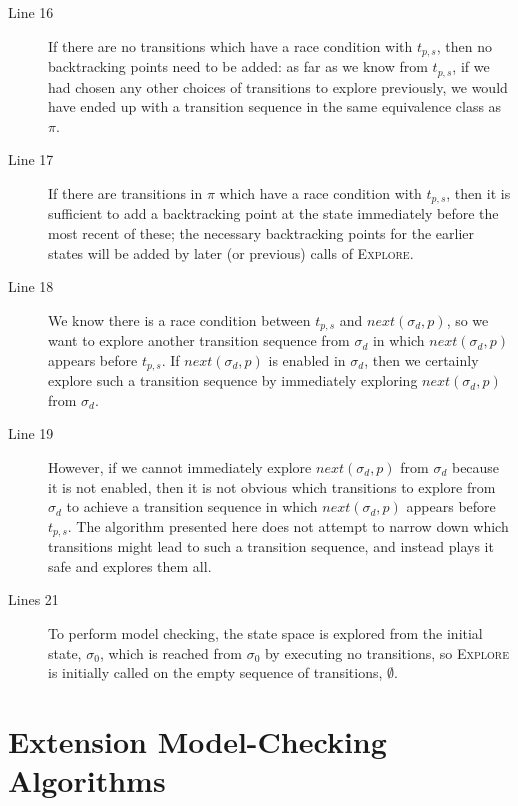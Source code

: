 \documentclass[12pt,a4paper,twoside,openright]{report}
\begin{document}
\begin{description}
	\item[Line 16] If there are no transitions which have
	a race condition with $t_{p,s}$, then no backtracking
	points need to be added: as far as we know from $t_{p,s}$,
	if we had chosen any other
	choices of transitions to explore previously, we would
	have ended up with a transition sequence in the same
	equivalence class as $\pi$.

	\item[Line 17] If there are transitions in $\pi$
	which have a race condition with $t_{p,s}$, then
	it is sufficient to add a backtracking point at
	the state immediately before
	the most recent of these;
	the necessary backtracking
	points for the earlier states will be added
	by later (or previous) calls of \textsc{Explore}.

	\item[Line 18] We know there is a race condition
	between $t_{p,s}$ and $\textit{next}(\sigma_d,p)$, so
	we want to explore another transition sequence from
	$\sigma_d$ in which $\textit{next}(\sigma_d,p)$
	appears before $t_{p,s}$. If $\textit{next}(\sigma_d,p)$
	is enabled in $\sigma_d$, then we certainly explore such
	a transition sequence by immediately exploring
	$\textit{next}(\sigma_d,p)$ from $\sigma_d$.

	\item[Line 19] However, if we cannot immediately
	explore $\textit{next}(\sigma_d,p)$
	from $\sigma_d$ because it is not enabled, then it is
	not obvious which transitions to explore from $\sigma_d$
	to achieve
	a transition sequence in which $\textit{next}(\sigma_d,p)$
	appears before $t_{p,s}$. The algorithm presented here
	does not attempt to narrow down which transitions might
	lead to such a transition sequence, and instead plays it
	safe and explores them all.

	\item[Lines 21] To perform model checking, the state space
	is explored from the initial state, $\sigma_0$, which is
	reached from $\sigma_0$ by executing no transitions, so
	\textsc{Explore} is initially called on the empty
	sequence of transitions, $\emptyset$.

\end{description}

\chapter{Extension Model-Checking Algorithms}
\label{app:pseudocode}
\end{document}

